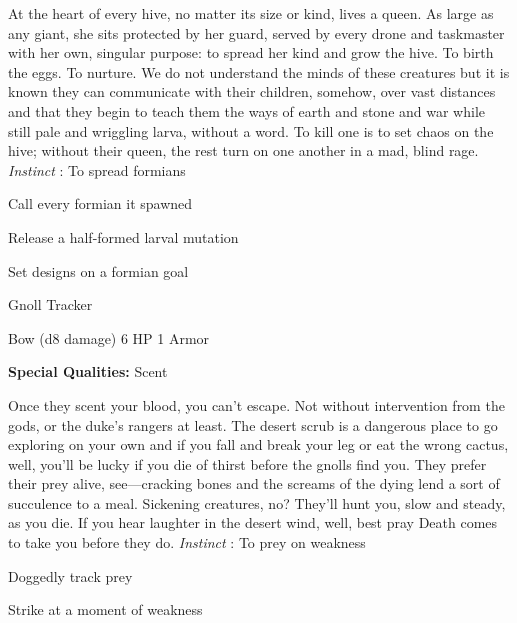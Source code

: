 \startMonsterDescription
At the heart of every hive, no matter its size or kind, lives a queen. As large as any giant, she sits protected by her guard, served by every drone and taskmaster with her own, singular purpose: to spread her kind and grow the hive. To birth the eggs. To nurture. We do not understand the minds of these creatures but it is known they can communicate with their children, somehow, over vast distances and that they begin to teach them the ways of earth and stone and war while still pale and wriggling larva, without a word. To kill one is to set chaos on the hive; without their queen, the rest turn on one another in a mad, blind rage. {\em Instinct} : To spread formians
\stopMonsterDescription
 
\startitemize[1,packed]

\item Call every formian it spawned

 
\item Release a half-formed larval mutation

 
\item Set designs on a formian goal


\stopitemize
 
\startMonsterName
Gnoll Tracker	 
\stopMonsterName
 

Bow (d8 damage)	6 HP	1 Armor

 


 
\startMonsterQualities
{\bf Special Qualities:}  Scent
\stopMonsterQualities
 
\startMonsterDescription
Once they scent your blood, you can’t escape. Not without intervention from the gods, or the duke’s rangers at least. The desert scrub is a dangerous place to go exploring on your own and if you fall and break your leg or eat the wrong cactus, well, you’ll be lucky if you die of thirst before the gnolls find you. They prefer their prey alive, see—cracking bones and the screams of the dying lend a sort of succulence to a meal. Sickening creatures, no? They’ll hunt you, slow and steady, as you die. If you hear laughter in the desert wind, well, best pray Death comes to take you before they do. {\em Instinct} : To prey on weakness
\stopMonsterDescription
 
\startitemize[1,packed]

\item Doggedly track prey

 
\item Strike at a moment of weakness


